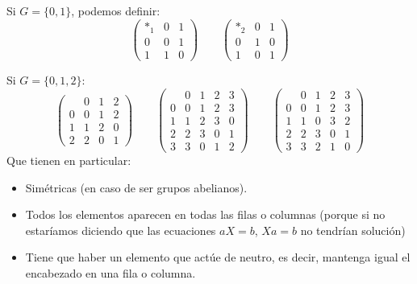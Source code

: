 \begin{ejemplo}
    Si $G=\{0,1\}$, podemos definir:
    \begin{equation*}
        \left(\begin{array}{c|cc}
            \ast_1 & 0 & 1 \\
            \hline 
            0 & 0 & 1 \\
            1 & 1 & 0
        \end{array}\right) \qquad 
        \left(\begin{array}{c|cc}
            \ast_2 & 0 & 1 \\
            \hline 
            0 & 1 & 0 \\
            1 & 0 & 1
        \end{array}\right)
    \end{equation*}

    Si $G=\{0,1,2\}$:
    \begin{equation*}
        \left(\begin{array}{c|ccc}
             & 0 & 1 & 2 \\
             \hline
            0 & 0 & 1 & 2 \\
            1 & 1 & 2 & 0 \\
            2 & 2 & 0 & 1 
        \end{array}\right) \qquad 
        \left(\begin{array}{c|cccc}
             & 0 & 1 & 2 & 3 \\
             \hline 
            0 & 0 & 1 & 2 & 3\\
            1 & 1 & 2 & 3 & 0 \\
            2 & 2 & 3 &  0 & 1 \\
            3 & 3 & 0 & 1 & 2
        \end{array}\right) \qquad 
        \left(\begin{array}{c|cccc}
             & 0 & 1 & 2 & 3 \\
             \hline 
            0 & 0 & 1 & 2 & 3 \\
            1 & 1 & 0 & 3  & 2\\
            2& 2 & 3 & 0 & 1 \\ 
            3 & 3 & 2 & 1 & 0
        \end{array}\right)
    \end{equation*}
    Que tienen en particular:
    \begin{itemize}
        \item Simétricas (en caso de ser grupos abelianos).
        \item Todos los elementos aparecen en todas las filas o columnas (porque si no estaríamos diciendo que las ecuaciones $aX=b$, $Xa=b$ no tendrían solución)
        \item Tiene que haber un elemento que actúe de neutro, es decir, mantenga igual el encabezado en una fila o columna.
    \end{itemize}
\end{ejemplo}

